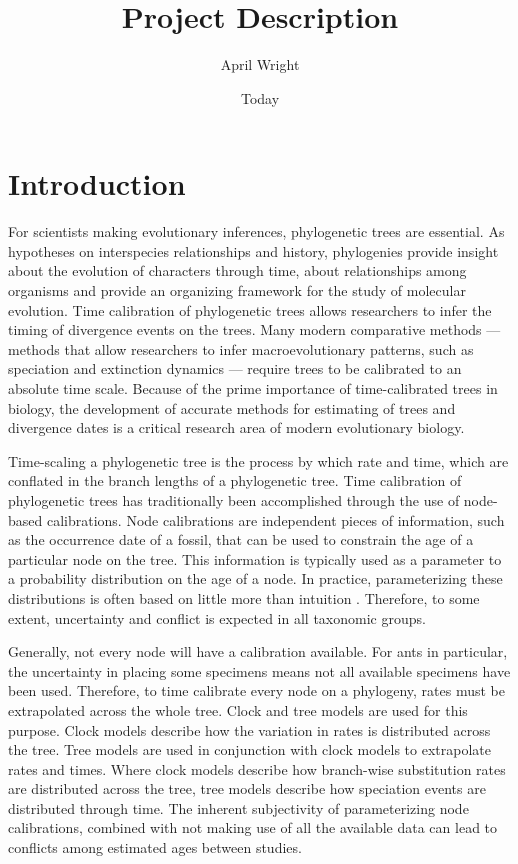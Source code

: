 \documentclass[]{article}
\begin{document}
\title{Project Description}
\author{April Wright}
\date{Today}
\maketitle

\section*{Introduction}
    For scientists making evolutionary inferences, phylogenetic trees are essential. As hypotheses on interspecies relationships and history, phylogenies provide insight about the evolution of characters through time, about relationships among organisms and provide an organizing framework for the study of molecular evolution. Time calibration of phylogenetic trees allows researchers to infer the timing of divergence events on the trees. Many modern comparative methods --- methods that allow researchers to infer macroevolutionary patterns, such as speciation and extinction dynamics --- require trees to be calibrated to an absolute time scale. Because of the prime importance of time-calibrated trees in biology, the development of accurate methods for estimating of trees and divergence dates is a critical research area of modern evolutionary biology. \par
    Time-scaling a phylogenetic tree is the process by which rate and time, which are conflated in the branch lengths of a phylogenetic tree. Time calibration of phylogenetic trees has traditionally been accomplished through the use of node-based calibrations. Node calibrations are independent pieces of information, such as the occurrence date of a fossil, that can be used to constrain the age of a particular node on the tree. This information is typically used as a parameter to a probability distribution on the age of a node.  In practice, parameterizing these distributions is often based on little more than intuition \citep{Heath22072014}. Therefore, to some extent, uncertainty and conflict is expected in all taxonomic groups.  \par
Generally, not every node will have a calibration available. For ants in particular, the uncertainty in placing some specimens means not all available specimens have been used. Therefore, to time calibrate every node on a phylogeny, rates must be extrapolated across the whole tree. Clock and tree models are used for this purpose. Clock models describe how the variation in rates is distributed across the tree. Tree models are used in conjunction with clock models to extrapolate rates and times. Where clock models describe how branch-wise substitution rates are distributed across the tree, tree models describe how speciation events are distributed through time. The inherent subjectivity of parameterizing node calibrations, combined with not making use of all the available data can lead to conflicts among estimated ages between studies. \par
\end{document}

